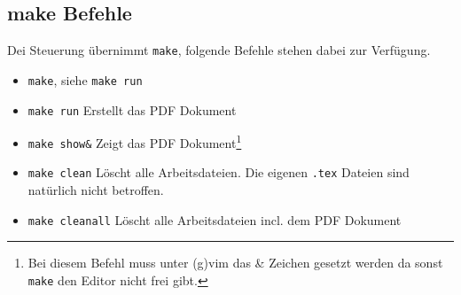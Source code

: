 \subsection{make Befehle}
\label{ssec:make_befehle}

\todo

Dei Steuerung übernimmt \verb!make!, folgende Befehle stehen
dabei zur Verfügung.

\begin{itemize}
	\item \verb!make!, siehe \verb!make run!
	\item \verb!make run!      \hspace{1em} Erstellt das PDF Dokument
	\item \verb!make show&!    \hspace{1em} Zeigt das PDF
		Dokument\footnote{Bei diesem Befehl muss unter (g)vim das \& Zeichen
	gesetzt werden da sonst \texttt{make} den Editor nicht frei gibt.}
	\item \verb!make clean!    \hspace{1em} Löscht alle Arbeitsdateien. Die
		eigenen \texttt{.tex} Dateien sind natürlich nicht betroffen.
	\item \verb!make cleanall! \hspace{1em} Löscht alle Arbeitsdateien incl.
		dem PDF Dokument
\end{itemize}




